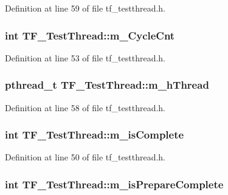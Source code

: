 Definition at line 59 of file tf\_\-testthread.h.\hypertarget{classTF__TestThread_a796b7c7257792b3eabdb65b3e3d8d990}{
\subsubsection[{m\_\-CycleCnt}]{\setlength{\rightskip}{0pt plus 5cm}int {\bf TF\_\-TestThread::m\_\-CycleCnt}}}
\label{classTF__TestThread_a796b7c7257792b3eabdb65b3e3d8d990}


Definition at line 53 of file tf\_\-testthread.h.\hypertarget{classTF__TestThread_a0c8b8d93ed2ae109221ea8da813ec389}{
\subsubsection[{m\_\-hThread}]{\setlength{\rightskip}{0pt plus 5cm}pthread\_\-t {\bf TF\_\-TestThread::m\_\-hThread}}}
\label{classTF__TestThread_a0c8b8d93ed2ae109221ea8da813ec389}


Definition at line 58 of file tf\_\-testthread.h.\hypertarget{classTF__TestThread_ab3f42e170b84b6b124fae56d403504c1}{
\subsubsection[{m\_\-isComplete}]{\setlength{\rightskip}{0pt plus 5cm}int {\bf TF\_\-TestThread::m\_\-isComplete}}}
\label{classTF__TestThread_ab3f42e170b84b6b124fae56d403504c1}


Definition at line 50 of file tf\_\-testthread.h.\hypertarget{classTF__TestThread_a5d92ac2f7010e79fb40326aa8980ddf3}{
\subsubsection[{m\_\-isPrepareComplete}]{\setlength{\rightskip}{0pt plus 5cm}int {\bf TF\_\-TestThread::m\_\-isPrepareComplete}}}
\label{classTF__TestThread_a5d92ac2f7010e79fb40326aa8980ddf3}


